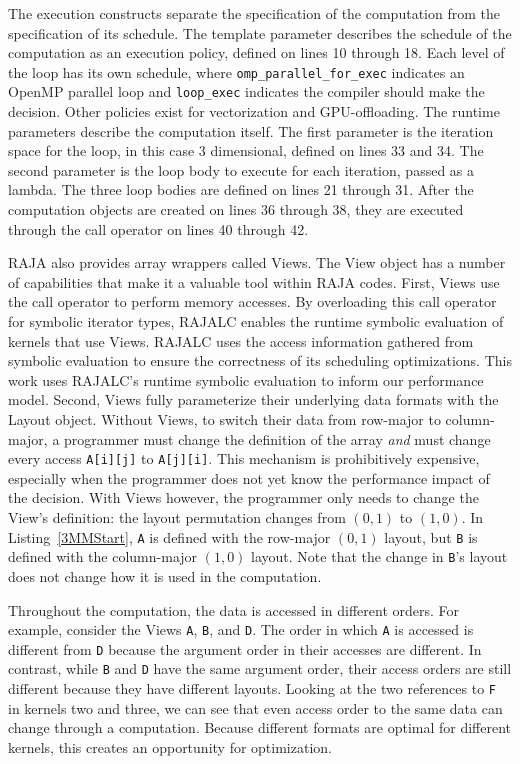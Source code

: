 \documentclass[sigconf,review=true]{acmart}
\begin{document}
The execution constructs separate the specification of the computation from the specification of its schedule.
The template parameter describes the schedule of the computation as an execution policy, defined on lines 10 through 18.
Each level of the loop has its own schedule, where \verb.omp_parallel_for_exec. indicates an OpenMP parallel loop and \verb.loop_exec. indicates the compiler should make the decision.
Other policies exist for vectorization and GPU-offloading.
The runtime parameters describe the computation itself. 
The first parameter is the iteration space for the loop, in this case 3 dimensional, defined on lines 33 and 34. 
The second parameter is the loop body to execute for each iteration, passed as a lambda.
The three loop bodies are defined on lines 21 through 31.
After the computation objects are created on lines 36 through 38, they are executed through the call operator on lines 40 through 42.

RAJA also provides array wrappers called Views.
The View object has a number of capabilities that make it a valuable tool within RAJA codes.
First, Views use the call operator to perform memory accesses. 
By overloading this call operator for symbolic iterator types, RAJALC enables the runtime symbolic evaluation of kernels that use Views.
RAJALC uses the access information gathered from symbolic evaluation to ensure the correctness of its scheduling optimizations.
This work uses RAJALC's runtime symbolic evaluation to inform our performance model.
Second, Views fully parameterize their underlying data formats with the Layout object.
Without Views, to switch their data from row-major to column-major, a programmer must change the definition of the array \textit{and} must change every access \verb.A[i][j]. to \verb.A[j][i]..
This mechanism is prohibitively expensive, especially when the programmer does not yet know the performance impact of the decision.
With Views however, the programmer only needs to change the View's definition: the layout permutation changes from $(0,1)$ to $(1,0)$. 
In Listing~\ref{3MMStart}, \verb.A. is defined with the row-major $(0,1)$ layout, but \verb.B. is defined with the column-major $(1,0)$ layout. 
Note that the change in \verb.B.'s layout does not change how it is used in the computation. 

Throughout the computation, the data is accessed in different orders.
For example, consider the Views \verb.A., \verb.B., and \verb.D..
The order in which \verb.A. is accessed is different from \verb.D. because the argument order in their accesses are different.
In contrast, while \verb.B. and \verb.D. have the same argument order, their access orders are still different because they have different layouts.
Looking at the two references to \verb.F. in kernels two and three, we can see that even access order to the same data can change through a computation.
Because different formats are optimal for different kernels, this creates an opportunity for optimization. 
\end{document}
